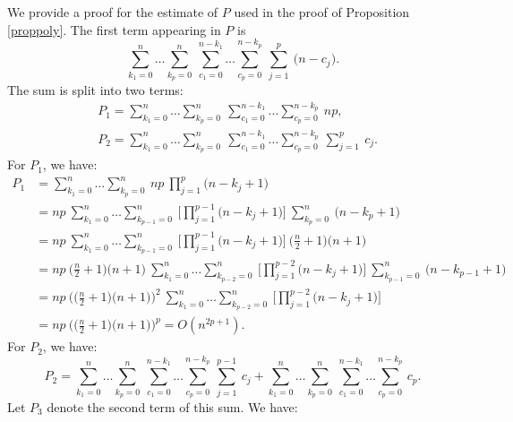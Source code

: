 \documentclass[anon,12pt]{colt2021} %
\begin{document}
We provide a proof for the estimate of $P$ used in the proof of Proposition \ref{proppoly}. The first term appearing in $P$ is
\begin{equation*}
    \sum_{k_{1}=0}^{n} \dots \sum_{k_{p}=0}^{n} \ \sum_{c_{1}=0}^{n-k_{1}} \dots \sum_{c_{p}=0}^{n-k_{p}} \ \sum_{j=1}^{p} \ \big( n-c_{j} \big).
\end{equation*}
The sum is split into two terms:
\begin{align*}
    &P_{1} = \sum_{k_{1}=0}^{n} \dots \sum_{k_{p}=0}^{n} \ \sum_{c_{1}=0}^{n-k_{1}} \dots \sum_{c_{p}=0}^{n-k_{p}} \ np, \\
    &P_{2} = \sum_{k_{1}=0}^{n} \dots \sum_{k_{p}=0}^{n} \ \sum_{c_{1}=0}^{n-k_{1}} \dots \sum_{c_{p}=0}^{n-k_{p}} \ \sum_{j=1}^{p} \ c_{j}.
\end{align*}
For $P_{1}$, we have:
\begin{align*}
    P_{1} &= \sum_{k_{1}=0}^{n} \dots \sum_{k_{p}=0}^{n} \ np \ \prod_{j=1}^{p} \big(n-k_{j} + 1 \big) \\
    &= np \ \sum_{k_{1}=0}^{n} \dots \sum_{k_{p-1}=0}^{n} \ \bigg[\prod_{j=1}^{p-1} \big(n-k_{j} + 1 \big) \bigg]\ \sum_{k_{p}=0}^{n} \ \big(n - k_{p} + 1 \big) \\
    &= np \ \sum_{k_{1}=0}^{n} \dots \sum_{k_{p-1}=0}^{n} \ \bigg[ \prod_{j=1}^{p-1} \big(n-k_{j} + 1 \big) \bigg] \ \bigg( \frac{n}{2} +1 \bigg) \bigg( n+1 \bigg) \\
    &= np \ \bigg( \frac{n}{2} +1 \bigg) \bigg( n+1 \bigg) \ \sum_{k_{1}=0}^{n} \dots \sum_{k_{p-2}=0}^{n} \ \bigg[ \prod_{j=1}^{p-2} \big(n-k_{j} + 1 \big) \bigg] \ \sum_{k_{p-1}=0}^{n} \ \big(n - k_{p-1} + 1 \big) \\
    &= np \ \bigg( \bigg( \frac{n}{2} +1 \bigg) \bigg( n+1 \bigg) \bigg)^{2} \ \sum_{k_{1}=0}^{n} \dots \sum_{k_{p-2}=0}^{n} \ \bigg[ \prod_{j=1}^{p-2} \big(n-k_{j} + 1 \big) \bigg] \\
    &= np \ \bigg( \bigg( \frac{n}{2} +1 \bigg) \big( n+1 \big) \bigg)^{p} 
    = O(n^{2p+1}).
\end{align*}
For $P_{2}$, we have:
\begin{equation*}
    P_{2} = \sum_{k_{1}=0}^{n} \dots \sum_{k_{p}=0}^{n} \ \sum_{c_{1}=0}^{n-k_{1}} \dots \sum_{c_{p}=0}^{n-k_{p}} \ \sum_{j=1}^{p-1} \ c_{j} 
    + \sum_{k_{1}=0}^{n} \dots \sum_{k_{p}=0}^{n} \ \sum_{c_{1}=0}^{n-k_{1}} \dots \sum_{c_{p}=0}^{n-k_{p}} \ c_{p}.
\end{equation*}
Let $P_{3}$ denote the second term of this sum. We have:
\end{document}
